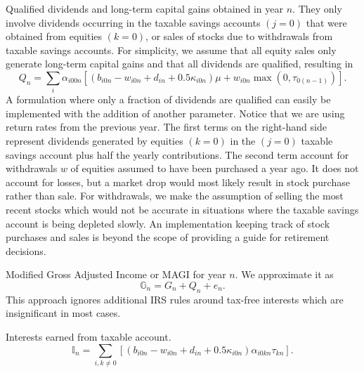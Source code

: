\documentclass{report}[fleqn,11pt]
\begin{document}
\begin{description}[leftmargin=4em,style=multiline]
\item [$Q_n$]
	Qualified dividends and long-term capital gains obtained in year $n$.
	They only involve dividends occurring in the taxable savings accounts $(j=0)$ that
	were obtained from equities $(k=0)$, or sales of stocks due to withdrawals
	from taxable savings accounts.
	For simplicity, we assume that all equity sales only generate long-term capital gains and
	that all dividends are qualified, resulting in
	\begin{equation}
		\label{Eq:Qx2}
		Q_n = \sum_i \alpha_{i00n}\left[(b_{i0n} - w_{i0n} + d_{in} + 0.5\kappa_{i0n})\mu +
		w_{i0n}{\max(0, \tau_{0(n-1)})}\right].
	\end{equation}
	A formulation where only a fraction of dividends are qualified can easily be
	implemented with the addition of another parameter.
	Notice that we are using return rates from the previous year.
	The first terms on the right-hand side represent dividends generated by
        equities $(k=0)$ in the $(j=0)$ taxable savings account plus
	half the yearly contributions. The second term account for withdrawals $w$
        of equities assumed to have been purchased a year ago. 
	It does not account for losses, but a market drop
	would most likely result in stock purchase rather than sale.
	For withdrawals, we make the assumption of
	selling the most recent stocks which would not be accurate in situations where
	the taxable savings account is being depleted slowly. An implementation keeping track
	of stock purchases and sales is beyond the scope of providing a guide for retirement decisions.

\item [$\mathbb{G}_n$]
	Modified Gross Adjusted Income or MAGI for year $n$. We approximate it as
	\begin{equation}
		\mathbb{G}_n = G_n + Q_n + e_n.
	\end{equation}
	This approach ignores additional IRS
	rules around tax-free interests which are insignificant in most cases.

\item [$\mathbb{I}_n$]
	Interests earned from taxable account.
	\begin{equation}
		\mathbb{I}_n = \sum_{i,k\neq 0} [(b_{i0n} - w_{i0n} + d_{in}
		     + 0.5\kappa_{i0n})\alpha_{i0kn}\tau_{kn}].
	\end{equation}


\end{description}
\end{document}
